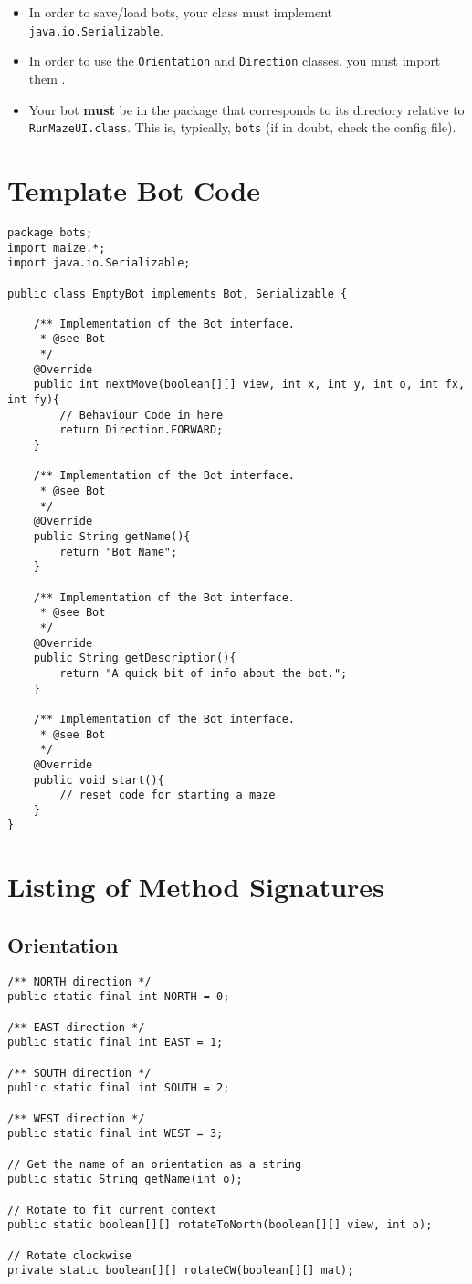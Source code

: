 \documentclass[11pt]{article}
\begin{document}
\begin{itemize}
\item In order to save/load bots, your class must implement \texttt{java.io.Serializable}.  
\item In order to use the \texttt{Orientation} and \texttt{Direction} classes, you must import them .
\item Your bot \textbf{must} be in the package that corresponds to its directory relative to \texttt{RunMazeUI.class}.  This is, typically, \texttt{bots} (if in doubt, check the config file).
\end{itemize}

\pagebreak
\section{Template Bot Code}
\label{section:template}
\begin{lstlisting}
package bots;
import maize.*;
import java.io.Serializable;

public class EmptyBot implements Bot, Serializable {

    /** Implementation of the Bot interface.
     * @see Bot
     */
    @Override
    public int nextMove(boolean[][] view, int x, int y, int o, int fx, int fy){
        // Behaviour Code in here
        return Direction.FORWARD;
    }

    /** Implementation of the Bot interface.
     * @see Bot
     */
    @Override
    public String getName(){
        return "Bot Name";
    }

    /** Implementation of the Bot interface.
     * @see Bot
     */
    @Override
    public String getDescription(){
        return "A quick bit of info about the bot.";
    }
    
    /** Implementation of the Bot interface.
     * @see Bot
     */
    @Override
    public void start(){
        // reset code for starting a maze
    }
}
\end{lstlisting}


\pagebreak
\appendix
\section{Listing of Method Signatures}
\subsection{Orientation}
\begin{lstlisting}
/** NORTH direction */
public static final int NORTH = 0;

/** EAST direction */
public static final int EAST = 1;

/** SOUTH direction */
public static final int SOUTH = 2;

/** WEST direction */
public static final int WEST = 3;

// Get the name of an orientation as a string
public static String getName(int o);

// Rotate to fit current context
public static boolean[][] rotateToNorth(boolean[][] view, int o);

// Rotate clockwise
private static boolean[][] rotateCW(boolean[][] mat);
\end{lstlisting}
\end{document}
